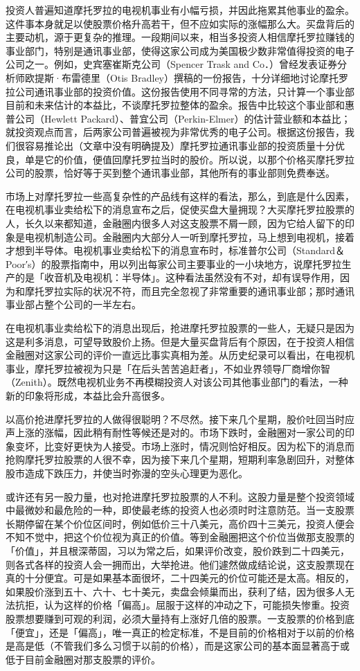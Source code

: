 \documentclass[UTF8,a4paper,zihao=-4,fontset = windows]{ctexart} %
\begin{document}
投资人普遍知道摩托罗拉的电视机事业有小幅亏损，并因此拖累其他事业的盈余。这件事本身就足以使股票价格升高若干，但不应如实际的涨幅那么大。买盘背后的主要动机，源于更复杂的推理。一段期间以来，相当多投资人相信摩托罗拉赚钱的事业部门，特别是通讯事业部，使得这家公司成为美国极少数非常值得投资的电子公司之一。例如，史宾塞崔斯克公司（Spencer Trask and Co．）曾经发表证券分析师欧提斯·布雷德里（Otis Bradley）撰稿的一份报告，十分详细地讨论摩托罗拉公司通讯事业部的投资价值。这份报告使用不同寻常的方法，只计算一个事业部目前和未来估计的本益比，不谈摩托罗拉整体的盈余。报告中比较这个事业部和惠普公司（Hewlett Packard）、普宜公司（Perkin-Elmer）的估计营业额和本益比；就投资观点而言，后两家公司普遍被视为非常优秀的电子公司。根据这份报告，我们很容易推论出（文章中没有明确提及）摩托罗拉通讯事业部的投资质量十分优良，单是它的价值，便值回摩托罗拉当时的股价。所以说，以那个价格买摩托罗拉公司的股票，恰好等于买到整个通讯事业部，其他所有的事业部则免费奉送。

市场上对摩托罗拉一些高复杂性的产品线有这样的看法，那么，到底是什么因素，在电视机事业卖给松下的消息宣布之后，促使买盘大量拥现？大买摩托罗拉股票的人，长久以来都知道，金融圈内很多人对这支股票不屑一顾，因为它给人留下的印象是电视机制造公司。金融圈内大部分人一听到摩托罗拉，马上想到电视机，接着才想到半导体。电视机事业卖给松下的消息宣布时，标准普尔公司（Standard＆Poor′s）的股票指南中，用以列出每家公司主要事业的一小块地方，说摩托罗拉生产的是「收音机及电视机：半导体」。这种看法虽然没有不对，却有误导作用，因为和摩托罗拉实际的状况不符，而且完全忽视了非常重要的通讯事业部；那时通讯事业部占整个公司的一半左右。

在电视机事业卖给松下的消息出现后，抢进摩托罗拉股票的一些人，无疑只是因为这是利多消息，可望导致股价上扬。但是大量买盘背后有个原因，在于投资人相信金融圈对这家公司的评价一直远比事实真相为差。从历史纪录可以看出，在电视机事业，摩托罗拉被视为只是「在后头苦苦追赶者」，不如业界领导厂商增你智（Zenith）。既然电视机业务不再模糊投资人对该公司其他事业部门的看法，一种新的印象将形成，本益比会升高很多。

以高价抢进摩托罗拉的人做得很聪明？不尽然。接下来几个星期，股价吐回当时应声上涨的涨幅，因此稍有耐性等候还是对的。市场下跌时，金融圈对一家公司的印象变坏，比变好更快为人接受。市场上涨时，情况则恰好相反。因为松下的消息而抢购摩托罗拉股票的人很不幸，因为接下来几个星期，短期利率急剧回升，对整体股市造成下跌压力，并使当时弥漫的空头心理更为恶化。

或许还有另一股力量，也对抢进摩托罗拉股票的人不利。这股力量是整个投资领域中最微妙和最危险的一种，即使最老练的投资人也必须时时注意防范。当一支股票长期停留在某个价位区间时，例如低价三十八美元，高价四十三美元，投资人便会不知不觉中，把这个价位视为真正的价值。等到金融圈把这个价位当做那支股票的「价值」，并且根深蒂固，习以为常之后，如果评价改变，股价跌到二十四美元，则各式各样的投资人会一拥而出，大举抢进。他们遽然做成结论说，这支股票现在真的十分便宜。可是如果基本面很坏，二十四美元的价位可能还是太高。相反的，如果股价涨到五十、六十、七十美元，卖盘会倾巢而出，获利了结，因为很多人无法抗拒，认为这样的价格「偏高」。屈服于这样的冲动之下，可能损失惨重。投资股票想要赚到可观的利润，必须大量持有上涨好几倍的股票。一支股票的价格到底「便宜」，还是「偏高」，唯一真正的检定标准，不是目前的价格相对于以前的价格是高是低（不管我们多么习惯于以前的价格），而是这家公司的基本面显著高于或低于目前金融圈对那支股票的评价。
\end{document}
